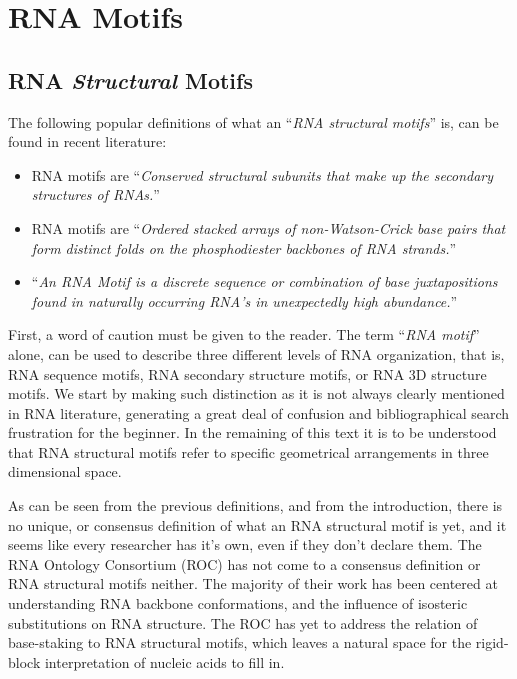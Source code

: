 \chapter{RNA Motifs}
\label{motifs} 


\section{RNA \textit{Structural} Motifs}
The following popular definitions of what an ``\textit{RNA structural
  motifs}'' is, can be found in recent literature:
\begin{itemize}
\item{RNA motifs are ``\textit{Conserved  structural subunits that  make up the  secondary
structures of RNAs.}''\cite{holbrook2005}}
\item{RNA motifs are ``\textit{Ordered stacked arrays of
non-Watson-Crick  base pairs that  form distinct  folds  on  the
phosphodiester backbones of  RNA strands.}''\cite{leontis2003}} 
\item{``\textit{An RNA Motif is a discrete sequence or combination of base
juxtapositions found in naturally occurring RNA's in unexpectedly high
abundance.}''\cite{moore1999}}
\end{itemize}
First, a word of caution must be given to the reader. The term
``\textit{RNA motif}'' alone, can be used to describe three different
levels of RNA organization, that is, RNA sequence motifs, RNA
secondary structure motifs, or RNA 3D structure motifs. We start by
making such distinction as it is not always clearly mentioned in RNA
literature, generating a great deal of confusion and bibliographical
search frustration for the beginner. In the remaining of
this text it is to be understood that RNA structural motifs refer to
specific geometrical arrangements in three dimensional space.

As can be seen from the previous definitions, and from the introduction, 
there is no unique,
or consensus definition of what an RNA structural motif is yet, and it
seems like every researcher has it's own, even if they don't declare
them. The RNA Ontology Consortium (ROC) has not come to a consensus
definition or RNA structural motifs neither. The majority of their
work has been centered at understanding RNA backbone conformations, and
the influence of isosteric substitutions on RNA structure. The
ROC has yet to address the relation of base-staking to RNA structural
motifs, which leaves a natural space for the rigid-block interpretation
of nucleic acids to fill in.

